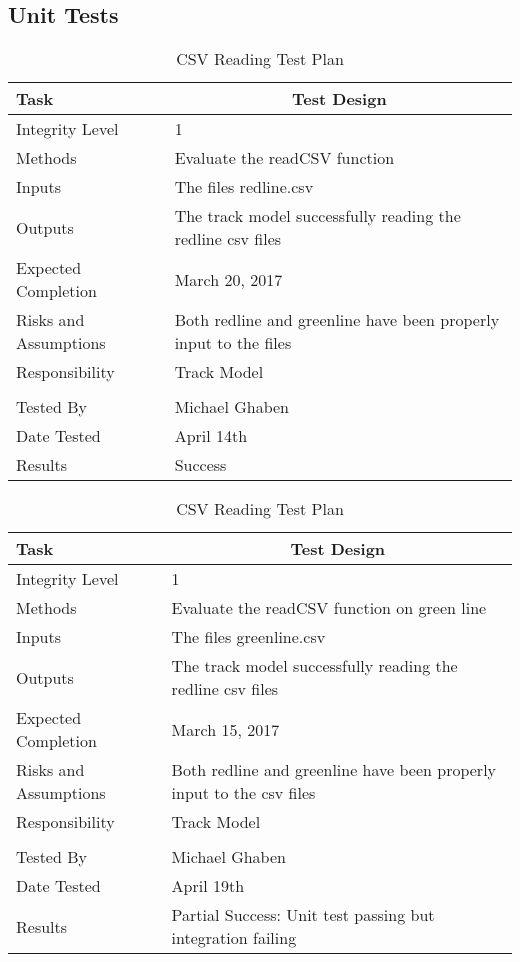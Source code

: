 \documentclass[]{article}
\begin{document}
\subsection{Unit Tests}
\begin{table}[H]
	\centering
	\caption{CSV Reading Test Plan}
	\begin{tabular}{|l|l|}
		\hline
		Task & \multicolumn{1}{c|}{Test Design} \\ \hline
		Integrity Level & 1 \\ \hline
		Methods & Evaluate the readCSV function\\ \hline
		Inputs &  The files redline.csv \\ \hline
		Outputs &  The track model successfully reading the redline csv files\\ \hline
		Expected Completion & March 20, 2017\\ \hline
		Risks and Assumptions & Both redline and greenline have been properly input to the files\\ \hline
		Responsibility & Track Model\\ \hline
		\\ \hline
		Tested By   &  Michael Ghaben\\	\hline
		Date Tested & \parbox[t]{10cm}{April 14th}\\ \hline
		Results & Success\\ \hline
	\end{tabular}
\end{table}



\begin{table}[H]
	\centering
	\caption{CSV Reading Test Plan}
	\begin{tabular}{|l|l|}
		\hline
		Task & \multicolumn{1}{c|}{Test Design} \\ \hline
		Integrity Level & 1 \\ \hline
		Methods & Evaluate the readCSV function on green line\\ \hline
		Inputs &  The files greenline.csv \\ \hline
		Outputs &  The track model successfully reading the redline csv files\\ \hline
		Expected Completion & March 15, 2017\\ \hline
		Risks and Assumptions & \parbox[t]{10cm}{Both redline and greenline have been properly input to the csv files}\\ \hline
		Responsibility & Track Model\\ \hline
		\\ \hline
		Tested By   &  Michael Ghaben\\	\hline
		Date Tested & \parbox[t]{10cm}{April 19th}\\ \hline
		Results & Partial Success: Unit test passing but integration failing\\ \hline
	\end{tabular}
\end{table}
\end{document}

